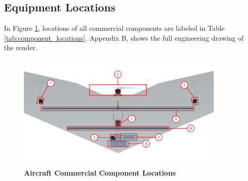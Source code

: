     
    \subsection{Equipment Locations}
    
        In Figure \ref{fig:component_locations}, locations of all commercial components are labeled in Table \ref{tab:component_locations}. Appendix B, shows the full engineering drawing of the render.
        
        \begin{figure}[H]
            \centering
            \includegraphics[width=0.9\textwidth]{homeworks/homework4/report/Figure/aircraft_assembly_underbelly_labeled.png}
            \caption{\textbf{Aircraft Commercial Component Locations}}
            \label{fig:component_locations}
        \end{figure}
        

